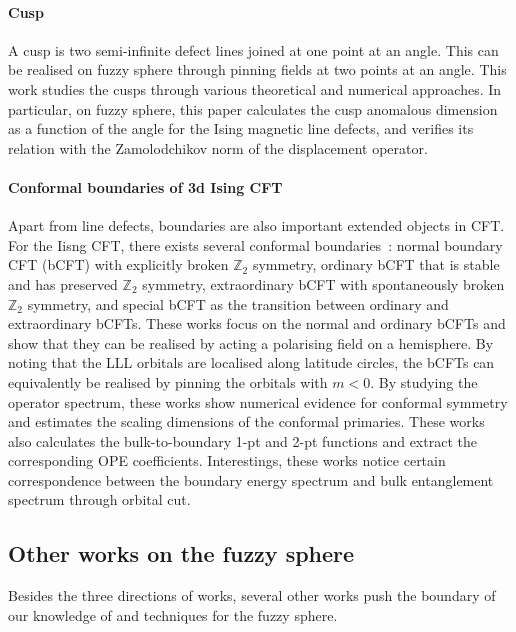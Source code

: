 \documentclass{timesjhep}
\begin{document}
\paragraph{Cusp~\cite{Cuomo2024}}

A cusp is two semi-infinite defect lines joined at one point at an angle. This can be realised on fuzzy sphere through pinning fields at two points at an angle. This work studies the cusps through various theoretical and numerical approaches. In particular, on fuzzy sphere, this paper calculates the cusp anomalous dimension as a function of the angle for the Ising magnetic line defects, and verifies its relation with the Zamolodchikov norm of the displacement operator. 

\paragraph{Conformal boundaries of 3d Ising CFT~\cite{Zhou2024Jul,Dedushenko2024}}

Apart from line defects, boundaries are also important extended objects in CFT. For the Iisng CFT, there exists several conformal boundaries~: normal boundary CFT (bCFT) with explicitly broken $\mathbb{Z}_2$ symmetry, ordinary bCFT that is stable and has preserved $\mathbb{Z}_2$ symmetry, extraordinary bCFT with spontaneously broken $\mathbb{Z}_2$ symmetry, and special bCFT as the transition between ordinary and extraordinary bCFTs. These works focus on the normal and ordinary bCFTs and show that they can be realised by acting a polarising field on a hemisphere. By noting that the LLL orbitals are localised along latitude circles, the bCFTs can equivalently be realised by pinning the orbitals with $m<0$. By studying the operator spectrum, these works show numerical evidence for conformal symmetry and estimates the scaling dimensions of the conformal primaries. These works also calculates the bulk-to-boundary 1-pt and 2-pt functions and extract the corresponding OPE coefficients. Interestings, these works notice certain correspondence between the boundary energy spectrum and bulk entanglement spectrum through orbital cut. 

\subsection{Other works on the fuzzy sphere}

Besides the three directions of works, several other works push the boundary of our knowledge of and techniques for the fuzzy sphere. 
\end{document}
